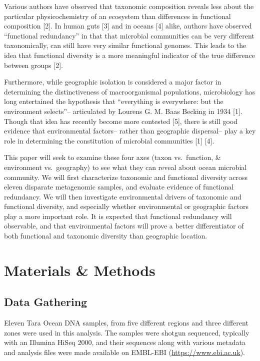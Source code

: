 \documentclass[12pt,a4paper,]{article}
\begin{document}
Various authors have observed that taxonomic composition reveals less
about the particular physicochemistry of an ecosystem than differences
in functional composition {[}2{]}. In human guts {[}3{]} and in oceans
{[}4{]} alike, authors have observed ``functional redundancy'' in that
that microbial communities can be very different taxonomically, can
still have very similar functional genomes. This leads to the idea that
functional diversity is a more meaningful indicator of the true
difference between groups {[}2{]}.

Furthermore, while geographic isolation is considered a major factor in
determining the distinctiveness of macroorganismal populations,
microbiology has long entertained the hypothesis that ``everything is
everywhere: but the environment selects''-- articulated by Lourens G. M.
Baas Becking in 1934 {[}1{]}. Though that idea has recently become more
contested {[}5{]}, there is still good evidence that environmental
factors-- rather than geographic dispersal-- play a key role in
determining the constitution of microbial communities {[}1{]} {[}4{]}.

This paper will seek to examine these four axes (taxon vs.~function, \&
environment vs.~geography) to see what they can reveal about ocean
microbial community. We will first characterize taxonomic and functional
diversity across eleven disparate metagenomic samples, and evaluate
evidence of functional redundancy. We will then investigate
environmental drivers of taxonomic and functional diversity, and
especially whether environmental or geographic factors play a more
important role. It is expected that functional redundancy will
observable, and that environmental factors will prove a better
differentiator of both functional and taxonomic diversity than
geographic location.

\section{Materials \& Methods}\label{materials-methods}

\subsection{Data Gathering}\label{data-gathering}

Eleven Tara Ocean DNA samples, from five different regions and three
different zones were used in this analysis. The samples were shotgun
sequenced, typically with an Illumina HiSeq 2000, and their sequences
along with various metadata and analysis files were made available on
EMBL-EBI (\url{https://www.ebi.ac.uk}).
\end{document}
